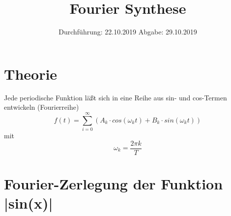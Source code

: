 

\subject{802}
\title{Fourier Synthese}
\date{%
  Durchführung: 22.10.2019
  \hspace{3em}
  Abgabe: 29.10.2019
}



\maketitle
\thispagestyle{empty}
\tableofcontents
\newpage
\newpage
\section{Theorie}
Jede periodische Funktion läßt sich in eine Reihe aus sin- und cos-Termen entwickeln (Fourierreihe)
\begin{equation}
  f(t)=\sum_{i=0}^\infty (A_k\cdot cos(\omega_k t) + B_k\cdot sin(\omega_k t))
\end{equation}
mit
\begin{equation}
\omega_k=\frac{2\pi k}{T}
\label{eqn:omega}
\end{equation}
\section{Fourier-Zerlegung der Funktion |sin(x)|}
